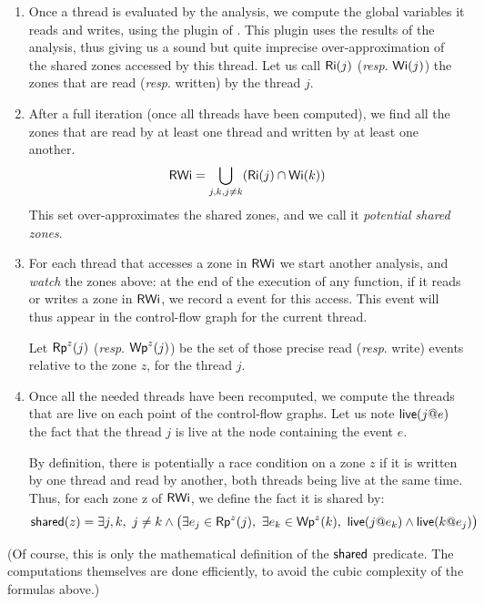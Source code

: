 \documentclass{frama-c-book}
\def\resp.{\emph{resp}.}
\begin{document}
\begin{enumerate}
\item Once a thread is evaluated by the \Eva analysis, we compute the
  global variables it reads and writes, using the \inout plugin
  of \FramaC. This plugin uses the results of the \Eva analysis,
  thus giving us a sound but quite imprecise over-approximation
  of the shared zones accessed by this thread. Let us call
  $\mathsf{Ri}(j)$ (\resp. $\mathsf{Wi}(j)$) the zones that are read
  (\resp. written) by the thread $j$.

\item After a full iteration (once all threads have been computed),
  we find all the zones that are read by at least one thread and written by
  at least one another.
  $$\mathsf{RWi}=\bigcup_{j,k,j\neq k}(\mathsf{Ri}(j) \cap \mathsf{Wi}(k))$$
  This set over-approximates the shared zones, and we
  call it \emph{potential shared zones}.

\item For each thread that accesses a zone in $\mathsf{RWi}$
  we start another \Eva analysis, and \emph{watch}
  the zones above: at the end of the execution of any
  function, if it reads or writes a zone in $\mathsf{RWi}$,
  we record a \mthread event for this access. This
  event will thus appear in the control-flow graph for the current
  thread.

  Let $\mathsf{Rp}^{z}(j)$ (\resp. $\mathsf{Wp}^{z}(j)$) be the set of those precise
  read (\resp. write) events relative to the zone  $z$, for the thread $j$.

\item Once all the needed threads have been recomputed, we compute
  the threads that are live on each point of the control-flow graphs.
  Let us note $\mathsf{live}(j@e)$ the fact that the thread $j$
  is live at the node containing the event $e$.

  By definition, there is potentially a race condition on a zone $z$
  if it is written by one thread and read by another, both threads being
  live at the same time.
  Thus,  for each zone z of $\mathsf{RWi}$, we define the fact it is shared by:
%
  $$\shared z=\exists {j,k},\ j\neq k \land \big(
       \exists e_j \in \Rp z j,\
        \exists e_k \in \Wp z k,\
       \live j {e_k} \land \live k {e_j}\big)
  $$

\end{enumerate}
(Of course, this is only the mathematical definition of the
$\shared{}$ predicate. The computations themselves are done
efficiently, to avoid the cubic complexity of the formulas
above.) %
\end{document}

